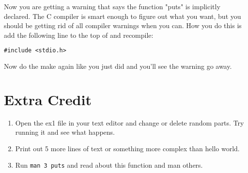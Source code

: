 Now you are getting a warning that says the function "puts" is implicitly declared.
The C compiler is smart enough to figure out what you want, but you should be
getting rid of all compiler warnings when you can.  How you do this is add the
following line to the top of  and recompile:

\begin{lstlisting}
#include <stdio.h>
\end{lstlisting}

Now do the make again like you just did and you'll see the warning go away.

\section{Extra Credit}

\begin{enumerate}
\item Open the ex1 file in your text editor and change or delete random parts.  Try running it and see what happens.
\item Print out 5 more lines of text or something more complex than hello world.
\item Run \verb|man 3 puts| and read about this function and man others.
\end{enumerate}



